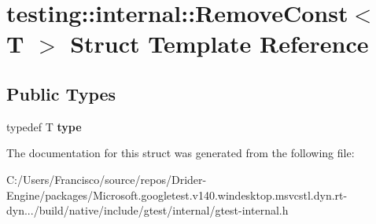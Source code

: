 \hypertarget{structtesting_1_1internal_1_1_remove_const}{}\section{testing\+:\+:internal\+:\+:Remove\+Const$<$ T $>$ Struct Template Reference}
\label{structtesting_1_1internal_1_1_remove_const}
\subsection*{Public Types}
\begin{DoxyCompactItemize}
\item 
\mbox{\label{structtesting_1_1internal_1_1_remove_const_a1be32027ea4edcc0d15abd59aba4a97f}} 
typedef T {\bfseries type}
\end{DoxyCompactItemize}


The documentation for this struct was generated from the following file\+:\begin{DoxyCompactItemize}
\item 
C\+:/\+Users/\+Francisco/source/repos/\+Drider-\/\+Engine/packages/\+Microsoft.\+googletest.\+v140.\+windesktop.\+msvcstl.\+dyn.\+rt-\/dyn.../build/native/include/gtest/internal/gtest-\/internal.\+h\end{DoxyCompactItemize}
